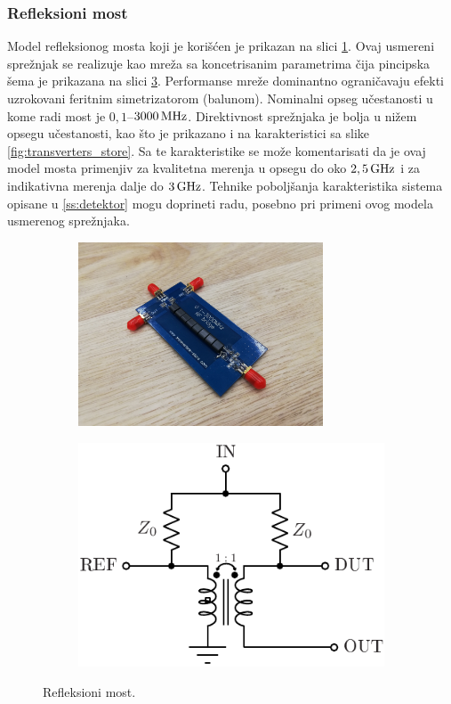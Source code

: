 \documentclass[a4paper, 12pt, diplomski]{etf}
\renewcommand{\unit}[1]{\,{\rm #1}}   %
\begin{document}
\subsubsection{Refleksioni most}
Model refleksionog mosta koji je korišćen je prikazan na slici
\ref{fig:SWR_bridge}. Ovaj usmereni sprežnjak se
realizuje kao mreža sa koncetrisanim parametrima
čija pincipska šema je prikazana na slici
\ref{fig:SWR_bridge_princ}. Performanse 
mreže dominantno ograničavaju efekti uzrokovani
feritnim simetrizatorom (balunom). 
Nominalni opseg učestanosti
u kome radi most je $0,1$--$3000\unit{MHz}$. 
Direktivnost sprežnjaka je bolja u nižem opsegu
učestanosti, kao što je prikazano i na 
karakteristici sa slike
 \ref{fig:transverters_store}. Sa te karakteristike 
 se može
 komentarisati da je ovaj model mosta primenjiv za 
 kvalitetna merenja u opsegu do oko $2,5\unit{GHz}$ i 
 za indikativna merenja dalje do $3\unit{GHz}$.
 Tehnike poboljšanja karakteristika 
 sistema opisane u \ref{ss:detektor} 
 mogu doprineti radu, posebno pri 
 primeni ovog modela usmerenog sprežnjaka.
%
\begin{figure}[ht!]
    \begin{subfigure}[b]{0.45\textwidth}
        \centering
        \includegraphics[width=0.8\textwidth]
        {fig/swr.jpg}
        \label{fig:SWR_bridge}
    \end{subfigure}
    \begin{subfigure}[b]{0.45\textwidth}
        \centering
        \includegraphics[scale=0.9]{fig/swr_bridge.pdf}
        \label{fig:SWR_bridge_princ}
    \end{subfigure}
    \caption{Refleksioni most.}
\end{figure}
\end{document}
